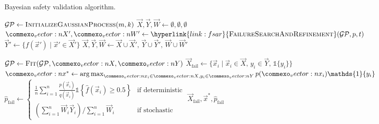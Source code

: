 \begin{algorithm}[H]
    \caption{Bayesian safety validation algorithm.} 
    \label{alg:bsv}
    \begin{algorithmic}[1]
    \State $\mathcal{GP} \leftarrow \textproc{InitializeGaussianProcess}(m, k)$
    \State $\vec{X}, \vec{Y}, \vec{W} \leftarrow \emptyset, \emptyset, \emptyset$
        \State $\vec{X}', \vec{W}' \leftarrow \hyperlink{link:fsar}{\textproc{FailureSearchAndRefinement}}(\mathcal{GP}, p, t)$  \label{line:subsequent_points}
        \State $\vec{Y}' \leftarrow \{f(\vec{x}') \mid \vec{x}' \in \vec{X}'\}$ 
        \State $\vec{X}, \vec{Y}, \vec{W} \leftarrow \vec{X} \cup \vec{X}',\, \vec{Y} \cup \vec{Y}',\, \vec{W} \cup \vec{W}'$ 

        \State $\mathcal{GP} \leftarrow \textproc{Fit}(\mathcal{GP}, \vec{X}, \vec{Y})$ 
    \EndFor
    \State $\vec{X}_\text{fail} \leftarrow \big\{\vec{x}_i \mid \vec{x}_i \in \vec{X},\, y_i \in \vec{Y},\, \mathds{1}\{y_i\}\big\}$  \label{line:falsification}
    \State $\vec{x}^* \leftarrow \argmax_{\vec{x}_i \in \vec{X}, y_i \in \vec{Y}} p(\vec{x}_i)\mathds{1}\{y_i\}$  \label{line:mlfa}
    \State $\hat{p}_\text{fail} \leftarrow \begin{cases}
        \frac{1}{n} \sum_{i=1}^n \frac{p(\vec{x}_i)}{q(\vec{x}_i)} \mathds{1}\left\{\hat{f}(\vec{x}_i) \ge 0.5 \right\} & \text{if deterministic} \\
        \left(\sum_{i=1}^n \vec{W}_i \vec{Y}_i\right) / \sum_{i=1}^n \vec{W}_i & \text{if stochastic}
    \end{cases}$  \label{line:fpe}
    \State \Return $\vec{X}_\text{fail}, \vec{x}^*, \hat{p}_\text{fail}$ 
    \EndFunction
    \end{algorithmic}
\end{algorithm}
